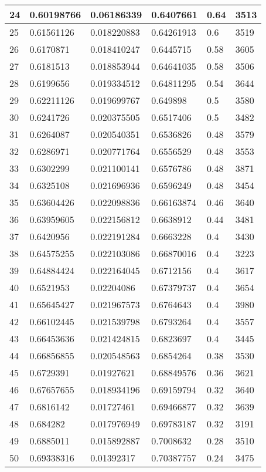 \begin{longtable}{|l|l|l|l|l|l|}
24 & 0.60198766 & 0.06186339 & 0.6407661 & 0.64 & 3513 \\ \hline 
25 & 0.61561126 & 0.018220883 & 0.64261913 & 0.6 & 3519 \\ \hline 
26 & 0.6170871 & 0.018410247 & 0.6445715 & 0.58 & 3605 \\ \hline 
27 & 0.6181513 & 0.018853944 & 0.64641035 & 0.58 & 3506 \\ \hline 
28 & 0.6199656 & 0.019334512 & 0.64811295 & 0.54 & 3644 \\ \hline 
29 & 0.62211126 & 0.019699767 & 0.649898 & 0.5 & 3580 \\ \hline 
30 & 0.6241726 & 0.020375505 & 0.6517406 & 0.5 & 3482 \\ \hline 
31 & 0.6264087 & 0.020540351 & 0.6536826 & 0.48 & 3579 \\ \hline 
32 & 0.6286971 & 0.020771764 & 0.6556529 & 0.48 & 3553 \\ \hline 
33 & 0.6302299 & 0.021100141 & 0.6576786 & 0.48 & 3871 \\ \hline 
34 & 0.6325108 & 0.021696936 & 0.6596249 & 0.48 & 3454 \\ \hline 
35 & 0.63604426 & 0.022098836 & 0.66163874 & 0.46 & 3640 \\ \hline 
36 & 0.63959605 & 0.022156812 & 0.6638912 & 0.44 & 3481 \\ \hline 
37 & 0.6420956 & 0.022191284 & 0.6663228 & 0.4 & 3430 \\ \hline 
38 & 0.64575255 & 0.022103086 & 0.66870016 & 0.4 & 3223 \\ \hline 
39 & 0.64884424 & 0.022164045 & 0.6712156 & 0.4 & 3617 \\ \hline 
40 & 0.6521953 & 0.02204086 & 0.67379737 & 0.4 & 3654 \\ \hline 
41 & 0.65645427 & 0.021967573 & 0.6764643 & 0.4 & 3980 \\ \hline 
42 & 0.66102445 & 0.021539798 & 0.6793264 & 0.4 & 3557 \\ \hline 
43 & 0.66453636 & 0.021424815 & 0.6823697 & 0.4 & 3445 \\ \hline 
44 & 0.66856855 & 0.020548563 & 0.6854264 & 0.38 & 3530 \\ \hline 
45 & 0.6729391 & 0.01927621 & 0.68849576 & 0.36 & 3621 \\ \hline 
46 & 0.67657655 & 0.018934196 & 0.69159794 & 0.32 & 3640 \\ \hline 
47 & 0.6816142 & 0.01727461 & 0.69466877 & 0.32 & 3639 \\ \hline 
48 & 0.684282 & 0.017976949 & 0.69783187 & 0.32 & 3191 \\ \hline 
49 & 0.6885011 & 0.015892887 & 0.7008632 & 0.28 & 3510 \\ \hline 
50 & 0.69338316 & 0.01392317 & 0.70387757 & 0.24 & 3475 \\ \hline 
\end{longtable}